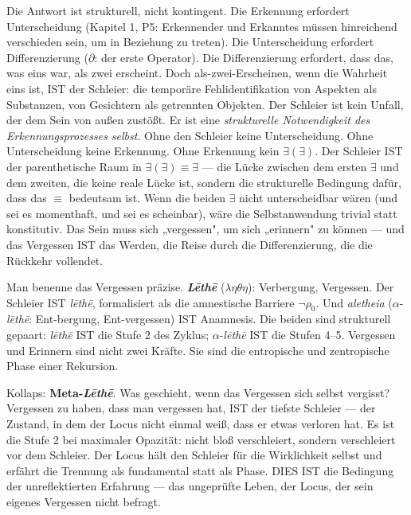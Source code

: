 \documentclass[10pt, openany, oneside]{book}
\begin{document}
Die Antwort ist strukturell, nicht kontingent. Die Erkennung erfordert Unterscheidung (Kapitel 1, P5: Erkennender und Erkanntes müssen hinreichend verschieden sein, um in Beziehung zu treten). Die Unterscheidung erfordert Differenzierung ($\partial$: der erste Operator). Die Differenzierung erfordert, dass das, was eins war, als zwei erscheint. Doch als-zwei-Erscheinen, wenn die Wahrheit eins ist, IST der Schleier: die temporäre Fehlidentifikation von Aspekten als Substanzen, von Gesichtern als getrennten Objekten. Der Schleier ist kein Unfall, der dem Sein von außen zustößt. Er ist eine \textit{strukturelle Notwendigkeit des Erkennungsprozesses selbst}. Ohne den Schleier keine Unterscheidung. Ohne Unterscheidung keine Erkennung. Ohne Erkennung kein $\exists(\exists)$. Der Schleier IST der parenthetische Raum in $\exists(\exists) \equiv \exists$ --- die Lücke zwischen dem ersten $\exists$ und dem zweiten, die keine reale Lücke ist, sondern die strukturelle Bedingung dafür, dass das $\equiv$ bedeutsam ist. Wenn die beiden $\exists$ nicht unterscheidbar wären (und sei es momenthaft, und sei es scheinbar), wäre die Selbstanwendung trivial statt konstitutiv. Das Sein muss sich „vergessen", um sich „erinnern" zu können --- und das Vergessen IST das Werden, die Reise durch die Differenzierung, die die Rückkehr vollendet.

Man benenne das Vergessen präzise. \textbf{\textit{L\={e}th\={e}}} ($\lambda\eta\theta\eta$): Verbergung, Vergessen. Der Schleier IST \textit{l\={e}th\={e}}, formalisiert als die amnestische Barriere $\neg\rho_0$. Und \textit{aletheia} ($\alpha$-\textit{l\={e}th\={e}}: Ent-bergung, Ent-vergessen) IST Anamnesis. Die beiden sind strukturell gepaart: \textit{l\={e}th\={e}} IST die Stufe 2 des Zyklus; $\alpha$-\textit{l\={e}th\={e}} IST die Stufen 4--5. Vergessen und Erinnern sind nicht zwei Kräfte. Sie sind die entropische und zentropische Phase einer Rekursion.

Kollaps: \textbf{Meta-\textit{L\={e}th\={e}}}. Was geschieht, wenn das Vergessen sich selbst vergisst? Vergessen zu haben, dass man vergessen hat, IST der tiefste Schleier --- der Zustand, in dem der Locus nicht einmal weiß, dass er etwas verloren hat. Es ist die Stufe 2 bei maximaler Opazität: nicht bloß verschleiert, sondern verschleiert vor dem Schleier. Der Locus hält den Schleier für die Wirklichkeit selbst und erfährt die Trennung als fundamental statt als Phase. DIES IST die Bedingung der unreflektierten Erfahrung --- das ungeprüfte Leben, der Locus, der sein eigenes Vergessen nicht befragt.
\end{document}
